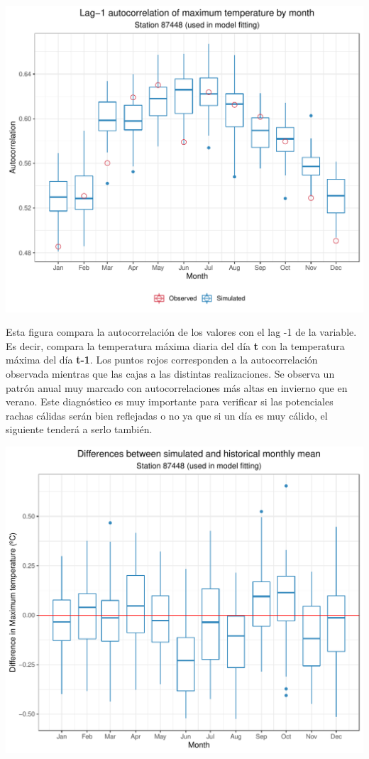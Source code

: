 \documentclass[
]{article}
\begin{document}
\begin{center}\includegraphics{Webinario_Generador_files/figure-latex/unnamed-chunk-44-1} \end{center}

Esta figura compara la autocorrelación de los valores con el lag -1 de la variable. Es decir, compara la temperatura máxima diaria del día \textbf{t} con la temperatura máxima del día \textbf{t-1}. Los puntos rojos corresponden a la autocorrelación observada mientras que las cajas a las distintas realizaciones. Se observa un patrón anual muy marcado con autocorrelaciones más altas en invierno que en verano. Este diagnóstico es muy importante para verificar si las potenciales rachas cálidas serán bien reflejadas o no ya que si un día es muy cálido, el siguiente tenderá a serlo también.

\begin{center}\includegraphics{Webinario_Generador_files/figure-latex/unnamed-chunk-45-1} \end{center}
\end{document}
